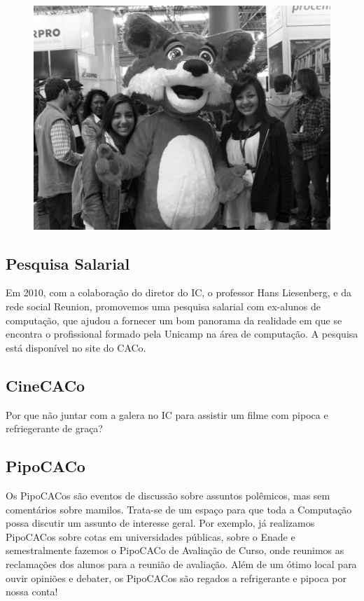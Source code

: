 \begin{figure}[H]
    \centering
    \includegraphics[scale=0.21]{img/caco/fisl.jpg}
\end{figure}

\subsection{Pesquisa Salarial}

Em 2010, com a colaboração do diretor do IC, o professor Hans Liesenberg,
e da rede social Reunion, promovemos uma pesquisa salarial com
ex-alunos de computação, que ajudou a fornecer um bom panorama da realidade em que se encontra
o profissional formado pela Unicamp na área de computação. A pesquisa
está disponível no site do CACo.

\subsection{CineCACo}

Por que não juntar com a galera no IC para assistir um filme com pipoca e
refriegerante de graça?

\subsection{PipoCACo}

Os PipoCACos são eventos de discussão sobre assuntos polêmicos, mas sem
comentários sobre  mamilos. Trata-se de um espaço para que toda a Computação
possa discutir um assunto de interesse geral. Por exemplo, já realizamos
PipoCACos sobre cotas em universidades públicas, sobre o Enade e semestralmente fazemos o PipoCACo de
Avaliação de Curso, onde reunimos as reclamações dos alunos para a reunião de
avaliação. Além de um ótimo local para ouvir opiniões e debater, os PipoCACos
são regados a refrigerante e pipoca por nossa conta!

